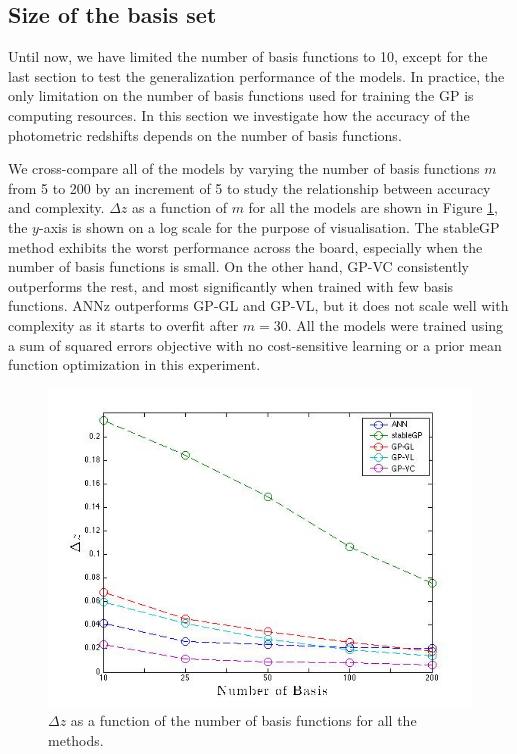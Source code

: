 \documentclass[useAMS,usenatbib,fleqn]{mn2e}
\begin{document}
\subsection{Size of the basis set}

Until now, we have limited the number of basis functions to 10, except for the last section to test the generalization performance of the models. In practice, the only limitation on the number of basis functions used for training the GP is computing resources. In this section we investigate how the accuracy of the photometric redshifts depends on the number of basis functions.

We cross-compare all of the models by varying the number of basis functions $m$ from 5 to 200 by an increment of 5 to study the relationship between accuracy and complexity. $\Delta z$ as a function of $m$ for all the models are shown in Figure \ref{fig-rmses}, the $y$-axis is shown on a log scale for the purpose of visualisation. The {\sc stableGP} method exhibits the worst performance across the board, especially when the number of basis functions is small. On the other hand, GP-VC consistently outperforms the rest, and most significantly when trained with few basis functions. {\sc ANNz} outperforms GP-GL and GP-VL, but it does not scale well with complexity as it starts to overfit after $m=30$. All the models were trained using a sum of squared errors objective with no cost-sensitive learning or a prior mean function optimization in this experiment. 

\begin{figure}
	\centering
	\includegraphics[width=\columnwidth]{figures/different-basis}
	\caption{$\Delta z$ as a function of the number of basis functions for all the methods.}
	\label{fig-rmses}
\end{figure}
\end{document}
